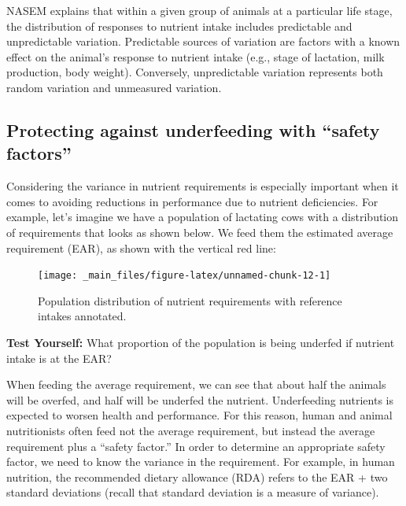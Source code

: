 \documentclass[
]{book}
\begin{document}
NASEM \citeyearpar{NASEM8} explains that within a given group of animals at a particular life stage, the distribution of responses to nutrient intake includes predictable and unpredictable variation. Predictable sources of variation are factors with a known effect on the animal's response to nutrient intake (e.g., stage of lactation, milk production, body weight). Conversely, unpredictable variation represents both random variation and unmeasured variation.

\hypertarget{protecting-against-underfeeding-with-safety-factors}{%
\subsection{Protecting against underfeeding with ``safety factors''}\label{protecting-against-underfeeding-with-safety-factors}}

Considering the variance in nutrient requirements is especially important when it comes to avoiding reductions in performance due to nutrient deficiencies. For example, let's imagine we have a population of lactating cows with a distribution of requirements that looks as shown below. We feed them the estimated average requirement (EAR), as shown with the vertical red line:

\begin{figure}

{\centering \texttt{[image: \_main\_files/figure-latex/unnamed-chunk-12-1]} 

}

\caption{Population distribution of nutrient requirements with reference intakes annotated.}\label{fig:unnamed-chunk-12}
\end{figure}

\textbf{Test Yourself: }
What proportion of the population is being underfed if nutrient intake is at the EAR?

When feeding the average requirement, we can see that about half the animals will be overfed, and half will be underfed the nutrient. Underfeeding nutrients is expected to worsen health and performance. For this reason, human and animal nutritionists often feed not the average requirement, but instead the average requirement plus a ``safety factor.'' In order to determine an appropriate safety factor, we need to know the variance in the requirement. For example, in human nutrition, the recommended dietary allowance (RDA) refers to the EAR + two standard deviations (recall that standard deviation is a measure of variance).
\end{document}
